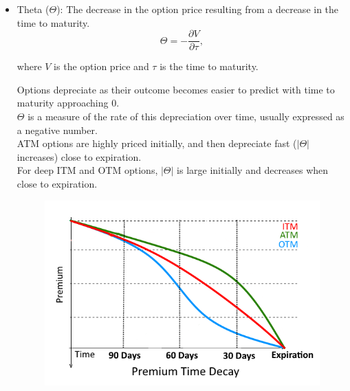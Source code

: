 \documentclass{article}
\begin{document}
\begin{itemize}
    \item Theta ($\Theta$): The decrease in the option price resulting from a decrease in the time to maturity.
          \begin{equation*}
              \Theta = -\frac{\partial V}{\partial \tau},
          \end{equation*}
          \begin{center}
              where $V$ is the option price and $\tau$ is the time to maturity.
          \end{center}
          Options depreciate as their outcome becomes easier to predict with time to maturity approaching 0. \\
          $\Theta$ is a measure of the rate of this depreciation over time,  usually expressed as a negative number. \\
          ATM options are highly priced initially, and then depreciate fast ($|\Theta|$ increases) close to expiration. \\
          For deep ITM and OTM options, $|\Theta|$ is large initially and decreases when close to expiration.
          \begin{figure}[H]
              \centering
              \includegraphics[scale=0.5]{Theta.png}
          \end{figure}


\end{itemize}
\end{document}

